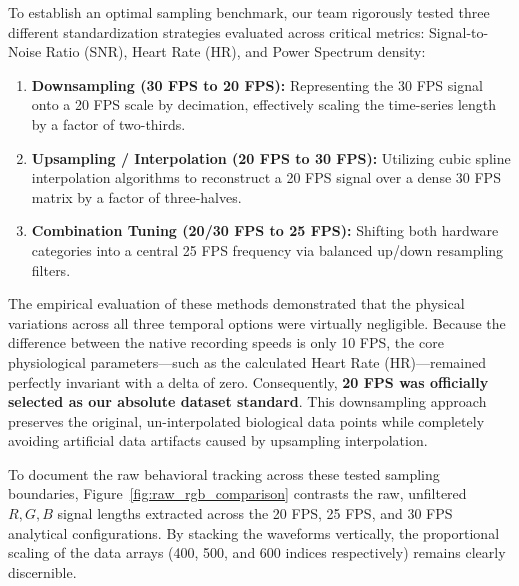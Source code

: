 To establish an optimal sampling benchmark, our team rigorously tested three different standardization strategies evaluated across critical metrics: Signal-to-Noise Ratio (SNR), Heart Rate (HR), and Power Spectrum density:
\begin{enumerate}
    \item \textbf{Downsampling (30 FPS to 20 FPS):} Representing the 30 FPS signal onto a 20 FPS scale by decimation, effectively scaling the time-series length by a factor of two-thirds.
    \item \textbf{Upsampling / Interpolation (20 FPS to 30 FPS):} Utilizing cubic spline interpolation algorithms to reconstruct a 20 FPS signal over a dense 30 FPS matrix by a factor of three-halves.
    \item \textbf{Combination Tuning (20/30 FPS to 25 FPS):} Shifting both hardware categories into a central 25 FPS frequency via balanced up/down resampling filters.
\end{enumerate}

The empirical evaluation of these methods demonstrated that the physical variations across all three temporal options were virtually negligible. Because the difference between the native recording speeds is only 10 FPS, the core physiological parameters—such as the calculated Heart Rate (HR)—remained perfectly invariant with a delta of zero. Consequently, \textbf{20 FPS was officially selected as our absolute dataset standard}. This downsampling approach preserves the original, un-interpolated biological data points while completely avoiding artificial data artifacts caused by upsampling interpolation.

To document the raw behavioral tracking across these tested sampling boundaries, Figure~\ref{fig:raw_rgb_comparison} contrasts the raw, unfiltered $R, G, B$ signal lengths extracted across the 20 FPS, 25 FPS, and 30 FPS analytical configurations. By stacking the waveforms vertically, the proportional scaling of the data arrays (400, 500, and 600 indices respectively) remains clearly discernible.


